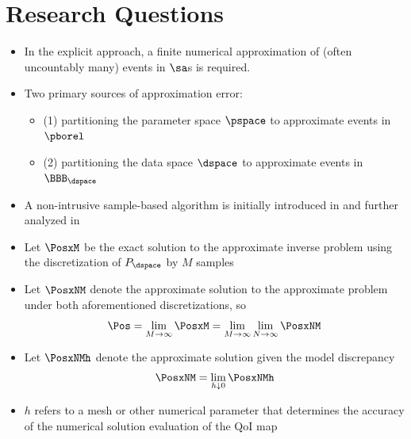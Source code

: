 
\section{Research Questions}
\begin{frame}[t]
\begin{itemize}
	\item In the explicit approach, a finite numerical approximation of (often uncountably many) events in $\sa$s is required.
	\item Two primary sources of approximation error: 
	\begin{itemize}[<+->]
	
		\item (1) partitioning the parameter space $\pspace$ to approximate events in $\pborel$
		\item (2) partitioning the data space $\dspace$ to approximate events in $\BBB_{\dspace}$
	
	\end{itemize}
	\item A non-intrusive sample-based algorithm is initially introduced in \cite{BET+14} and further analyzed in \cite{BET+14-arxiv}
\end{itemize}
\end{frame}


\begin{frame}[t]
\begin{itemize}
	\item <1-> Let $\PosxM$ be the exact solution to the approximate inverse problem using the discretization of $P_\dspace$ by $M$ samples
	\item <2-> Let $\PosxNM$ denote the approximate solution to the approximate problem under both aforementioned discretizations, so 
\[
\Pos = \lim\limits_{M\to\infty} \PosxM = \lim\limits_{M\to\infty} \lim\limits_{N\to\infty} \PosxNM
\]
	\item <3-> Let $\PosxNMh$ denote the approximate solution given the model discrepancy
\[
\PosxNM= \lim\limits_{h \downarrow 0} \PosxNMh
\]
\item <3-> $h$ refers to a mesh or other numerical parameter that determines the accuracy of the numerical solution evaluation of the QoI map
\end{itemize}

\end{frame}

